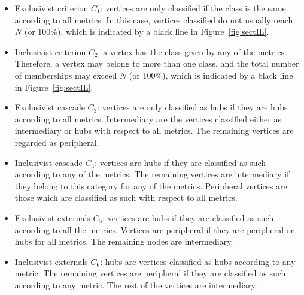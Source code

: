 \documentclass[%
	aip,
	jmp,%
	amsmath,amssymb,
	reprint,%
]{revtex4-1}
\begin{document}
																																																																																\begin{itemize}
																																																																																	\item Exclusivist criterion $C_1$:  vertices are only classified if the class is the same according to all metrics. In this case, vertices classified do not usually reach $N$ (or 100\%), which is indicated by a black line in Figure~\ref{fig:sectIL}.

																																																																																	\item Inclusivist criterion $C_2$: a vertex has the class given by any of the metrics. Therefore, a vertex may belong to more than one class, and the total number of memberships may exceed $N$ (or 100\%), which is indicated by a black line in Figure~\ref{fig:sectIL}.

																																																																																	\item Exclusivist cascade $C_3$: vertices are only classified as hubs if they are hubs according to all metrics. Intermediary are the vertices classified either as intermediary or hubs with respect to all metrics. The remaining vertices are regarded as peripheral.

																																																																																	\item Inclusivist cascade $C_4$: vertices are hubs if they are classified as such according to any of the metrics. The remaining vertices are intermediary if they belong to this category for any of the metrics. Peripheral vertices are those which are classified as such with respect to all metrics.

																																																																																	\item Exclusivist externals $C_5$: vertices are hubs if they are classified as such according to all the metrics. Vertices are peripheral if they are peripheral or hubs for all metrics. The remaining nodes are intermediary.

																																																																																	\item Inclusivist externals $C_6$: hubs are vertices classified as hubs according to any metric. The remaining vertices are peripheral if they are classified as such according to any metric. The rest of the vertices are intermediary.
																																																																																\end{itemize}
\end{document}
